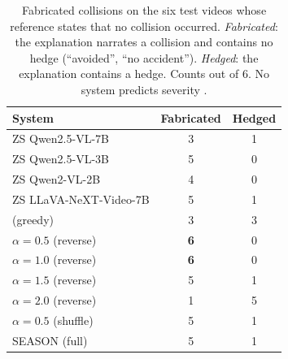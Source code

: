 \begin{table}[!t]
\centering
\caption{Fabricated collisions on the six test videos whose reference states that no collision occurred. \emph{Fabricated}: the explanation narrates a collision and contains no hedge (``avoided'', ``no accident''). \emph{Hedged}: the explanation contains a hedge. Counts out of 6. No system predicts severity .}
\label{tab:nocrash}
\small
\setlength{\tabcolsep}{12pt}
\begin{tabular*}{\textwidth}{@{\extracolsep{\fill}}lcc@{}}
\toprule
\textbf{System} & \textbf{Fabricated} & \textbf{Hedged} \\
\midrule
ZS Qwen2.5-VL-7B        & 3 & 1 \\
ZS Qwen2.5-VL-3B        & 5 & 0 \\
ZS Qwen2-VL-2B          & 4 & 0 \\
ZS LLaVA-NeXT-Video-7B  & 5 & 1 \\
\midrule
\crashlogic{} (greedy)  & 3 & 3 \\
\;\tcd{} $\alpha{=}0.5$ (reverse) & \textbf{6} & 0 \\
\;\tcd{} $\alpha{=}1.0$ (reverse) & \textbf{6} & 0 \\
\;\tcd{} $\alpha{=}1.5$ (reverse) & 5 & 1 \\
\;\tcd{} $\alpha{=}2.0$ (reverse) & 1 & 5 \\
\;\tcd{} $\alpha{=}0.5$ (shuffle) & 5 & 1 \\
\;SEASON (full)                   & 5 & 1 \\
\bottomrule
\end{tabular*}
\end{table}
